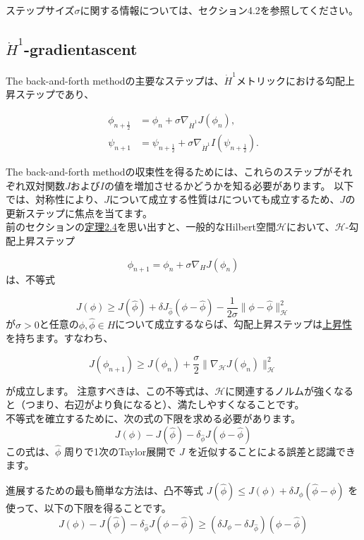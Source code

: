 \documentclass{jsarticle}
\theoremstyle{definition}
\begin{document}
ステップサイズ$\sigma$に関する情報については、セクション4.2を参照してください。


\subsection{$\dot{H}^1$-gradientascent}
\label{sect:H1-gradient ascent}
The back-and-forth methodの主要なステップは、$\dot{H}^1$メトリックにおける勾配上昇ステップであり、

\begin{align*}
\phi_{n + \frac{1}{2}} &= \phi_n + \sigma \nabla_{\dot{H}^1} J(\phi_n), \\
\psi_{n + 1} &= \psi_{n + \frac{1}{2}} + \sigma \nabla_{\dot{H}^1} I(\psi_{n + \frac{1}{2}}).
\end{align*}

The back-and-forth methodの収束性を得るためには、これらのステップがそれぞれ双対関数$J$および$I$の値を増加させるかどうかを知る必要があります。
以下では、対称性により、$J$について成立する性質は$I$についても成立するため、$J$の更新ステップに焦点を当てます。\\



前のセクションの\hyperlink{定理2.4}{定理2.4}を思い出すと、一般的なHilbert空間$\mathcal{H} $において、$\mathcal{H}$-勾配上昇ステップ

$$\phi_{n+1}=\phi_n+\sigma\nabla_H J(\phi_n)$$
は、不等式

\begin{equation}
  J(\phi)\geq J(\hat{\phi})+\delta J _{\hat{\phi}}(\phi-\hat{\phi})-\frac{1}{2\sigma}\|\phi-\hat{\phi}\|_{\mathcal{H}}^2
\end{equation}
が$\sigma>0$と任意の$\phi,\hat{\phi}\in H$について成立するならば、勾配上昇ステップは\hyperlink{上昇性}{上昇性}を持ちます。すなわち、

$$
J(\phi_{n+1})\geq J(\phi_n) + \frac{\sigma}{2}\|\nabla_\mathcal{H}  J(\phi_n)\|_\mathcal{H}^2
$$

が成立します。
注意すべきは、この不等式は、$\mathcal{H} $に関連するノルムが強くなると（つまり、右辺がより負になると）、満たしやすくなることです。\\


不等式を確立するために、次の式の下限を求める必要があります。
$$
J(\phi) - J(\hat{\phi}) - \delta_{\hat{\phi}} J (\phi - \hat{\phi})
$$
この式は、$\hat{\phi}$ 周りで1次のTaylor展開で $J$ を近似することによる誤差と認識できます。

{\color{teal}
進展するための最も簡単な方法は、凸不等式 $J(\hat{\phi}) \le J(\phi) + \delta J_{\phi}(\hat{\phi} - \phi)$ を使って、以下の下限を得ることです。}
$$
J(\phi) - J(\hat{\phi}) - \delta_{\hat{\phi}} J(\phi-\hat{\phi}) \ge (\delta J_{\phi} - \delta J_{\hat{\phi}}) (\phi - \hat{\phi})
$$
\end{document}
